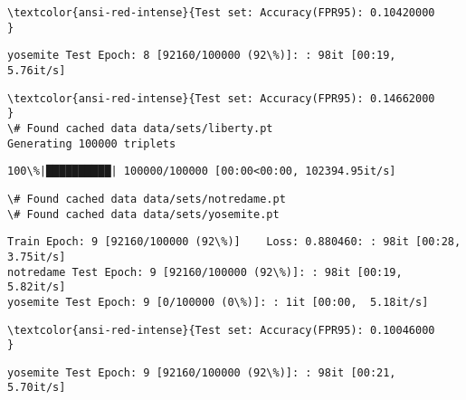 \documentclass[11pt]{article}
\begin{document}
    \begin{Verbatim}[commandchars=\\\{\}]
\textcolor{ansi-red-intense}{Test set: Accuracy(FPR95): 0.10420000
}

    \end{Verbatim}

    \begin{Verbatim}[commandchars=\\\{\}]
yosemite Test Epoch: 8 [92160/100000 (92\%)]: : 98it [00:19,  5.76it/s]

    \end{Verbatim}

    \begin{Verbatim}[commandchars=\\\{\}]
\textcolor{ansi-red-intense}{Test set: Accuracy(FPR95): 0.14662000
}
\# Found cached data data/sets/liberty.pt
Generating 100000 triplets

    \end{Verbatim}

    \begin{Verbatim}[commandchars=\\\{\}]
100\%|██████████| 100000/100000 [00:00<00:00, 102394.95it/s]

    \end{Verbatim}

    \begin{Verbatim}[commandchars=\\\{\}]
\# Found cached data data/sets/notredame.pt
\# Found cached data data/sets/yosemite.pt

    \end{Verbatim}

    \begin{Verbatim}[commandchars=\\\{\}]
Train Epoch: 9 [92160/100000 (92\%)]	Loss: 0.880460: : 98it [00:28,  3.75it/s]
notredame Test Epoch: 9 [92160/100000 (92\%)]: : 98it [00:19,  5.82it/s]
yosemite Test Epoch: 9 [0/100000 (0\%)]: : 1it [00:00,  5.18it/s]
    \end{Verbatim}

    \begin{Verbatim}[commandchars=\\\{\}]
\textcolor{ansi-red-intense}{Test set: Accuracy(FPR95): 0.10046000
}

    \end{Verbatim}

    \begin{Verbatim}[commandchars=\\\{\}]
yosemite Test Epoch: 9 [92160/100000 (92\%)]: : 98it [00:21,  5.70it/s]

    \end{Verbatim}
\end{document}
